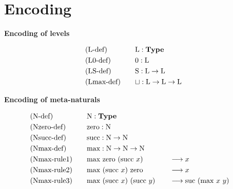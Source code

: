 \documentclass[]{StandardTemplate}
\begin{document}
\section{Encoding}
\label{sec:enc}
\begin{center}\textbf{Encoding of levels}\end{center}
\begin{alignat*}{2}  
&  \text{(L-def)}\quad&&\text{L} : \textbf{Type} \\
&  \text{(L0-def)}\quad&&0 : \text{L} \\
&  \text{(LS-def)}\quad&&\text{S} : \text{L} \to \text{L} \\
&  \text{(Lmax-def)}\quad&&\sqcup : \text{L} \to \text{L} \to \text{L}
\end{alignat*}
\begin{center}\textbf{Encoding of meta-naturals}\end{center}
\begin{alignat*}{3}
&  \text{(N-def)}\quad&&\text{N} : \textbf{Type} \\
&  \text{(Nzero-def)}\quad&&\text{zero} : \text{N} \\
&  \text{(Nsucc-def)}\quad&&\text{succ} : \text{N} \to \text{N} \\
&  \text{(Nmax-def)}\quad&&\text{max} : \text{N} \to \text{N} \to \text{N}\\
&  \text{(Nmax-rule1)}\quad&&\text{max}~\text{zero}~(\text{succ}~x)\quad&&\longrightarrow x\\
&  \text{(Nmax-rule2)}\quad&&\text{max}~(\text{succ}~x)~\text{zero}\quad&&\longrightarrow x\\  
&  \text{(Nmax-rule3)}\quad&&\text{max}~(\text{succ}~x)~(\text{succ}~y)\quad&&\longrightarrow \text{suc}~(\text{max}~x~y)
\end{alignat*}
\end{document}
